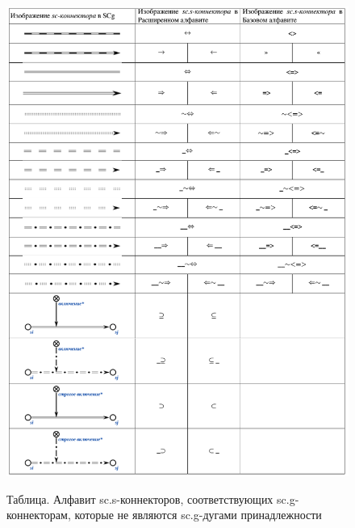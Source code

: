 \newpage
\begin{figure}[H]
	\centering
	\caption{Таблица. Алфавит sc.s-коннекторов, соответствующих sc.g-коннекторам, которые не являются sc.g-дугами принадлежности\scnsupergroupsign}
	\includegraphics[scale=0.44]{images/intro/scs_non_membership_connectors_1.png}
	\label{fig:scs_non_membership_connectors}
\end{figure}
